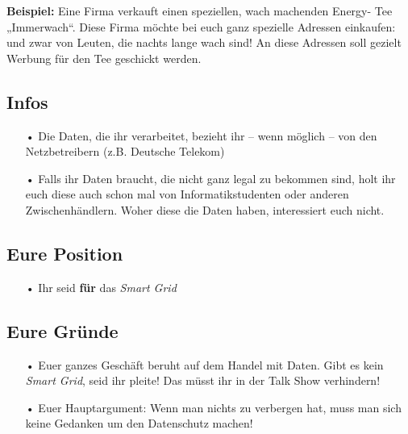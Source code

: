 \documentclass[11pt,a4paper,DIV=10,parskip=half,BCOR=0mm]{scrartcl}
\begin{document}
\textbf{Beispiel: }Eine Firma verkauft einen speziellen, wach machenden Energy-
Tee „Immerwach“. Diese Firma möchte bei euch ganz spezielle Adressen
einkaufen: und zwar von Leuten, die nachts lange wach sind! An diese
Adressen soll gezielt Werbung für den Tee geschickt werden.
\subsection*{Infos}
\begin{enumerate}
	\item[•]Die Daten, die ihr verarbeitet, bezieht ihr -- wenn möglich -- von den Netzbetreibern (z.B.
	Deutsche Telekom)
	\item[•]Falls ihr Daten braucht, die nicht ganz legal zu bekommen sind, holt
	ihr euch diese auch schon mal von Informatikstudenten oder
	anderen Zwischenhändlern. Woher diese die Daten haben,
	interessiert euch nicht.
\end{enumerate}
\subsection*{Eure Position}
\begin{enumerate}
	\item[•]Ihr seid \textbf{für} das \textit{Smart Grid}
\end{enumerate}
\subsection*{Eure Gründe}
\begin{enumerate}
	\item[•]Euer ganzes Geschäft beruht auf dem Handel mit Daten. Gibt es
	kein \textit{Smart Grid}, seid ihr pleite! Das müsst ihr in der Talk Show
	verhindern!
	\item[•] Euer Hauptargument: \glqq Wenn man nichts zu verbergen hat, muss man sich keine Gedanken um den Datenschutz machen!\grqq
\end{enumerate}
\end{document}
